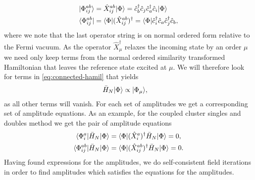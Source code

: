             \begin{align}
                | \Phi^{ab}_{ij} \rangle
                &= \hat{X}^{ab}_{ij}| \Phi \rangle
                = \hat{c}_{b}^{\dagger}\hat{c}_{j}\hat{c}_{a}^{\dagger}\hat{c}_{i}| \Phi \rangle
                \\
                \langle \Phi^{ab}_{ij} |
                &= \langle \Phi |(\hat{X}^{ab}_{ij})^{\dagger}
                = \langle \Phi | \hat{c}_{i}^{\dagger}\hat{c}_{a}\hat{c}_{j}^{\dagger}\hat{c}_{b},
            \end{align}
            where we note that the last operator string is on normal ordered
            form relative to the Fermi vacuum.
            As the operator $\hat{X}^{\dagger}_{\mu}$ relaxes the incoming state
            by an order $\mu$ we need only keep terms from the normal ordered
            similarity transformed Hamiltonian that leaves the reference state
            excited at $\mu$.
            We will therefore look for terms in \autoref{eq:connected-hamil}
            that yields
            \begin{align}
                \bar{H}_N| \Phi \rangle
                &\propto | \Phi_{\mu} \rangle,
            \end{align}
            as all other terms will vanish.
            For each set of amplitudes we get a corresponding set of amplitude
            equations.
            As an example, for the coupled cluster singles and doubles method we
            get the pair of amplitude equations
            \begin{gather}
                \langle \Phi^{a}_{i} |
                \bar{H}_N| \Phi \rangle
                =
                \langle \Phi |
                (\hat{X}^{a}_{i})^{\dagger}
                \bar{H}_N| \Phi \rangle
                = 0,
                \\
                \langle \Phi^{ab}_{ij} |
                \bar{H}_N| \Phi \rangle
                =
                \langle \Phi |
                (\hat{X}^{ab}_{ij})^{\dagger}
                \bar{H}_N| \Phi \rangle
                = 0.
            \end{gather}
            Having found expressions for the amplitudes, we do self-consistent
            field iterations in order to find amplitudes which satisfies the
            equations for the amplitudes.


